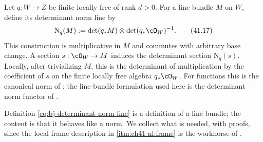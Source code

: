 \begin{definition}
\label{def:ch41-norm-line}
Let $q:W\to Z$ be finite locally free of rank $d>0$.  For a line
bundle $M$ on $W$, define its determinant norm line by
\[
 \mathrm N_q(M):=
 \det(q_*M)\otimes\det(q_*\cO_W)^{-1}.
\tag{41.17}\label{eq:bj-determinant-norm-line}
\]
This construction is multiplicative in $M$ and commutes with arbitrary
base change.  A section $s:\cO_W\to M$ induces the determinant section
$\mathrm N_q(s)$.  Locally, after trivializing $M$, this is the determinant
of multiplication by the coefficient of $s$ on the finite locally free
algebra $q_*\cO_W$.
For functions this is the canonical norm of
\cite[\href{https://stacks.math.columbia.edu/tag/0BD2}{Tag 0BD2}]
{stacks-project}; the line-bundle formulation used here is the determinant
norm functor of \cite[Proposition~3.3]{FerrandNorm}.
\end{definition}

Definition \eqref{eq:bj-determinant-norm-line} is a definition of a line
bundle; the content is that it behaves like a norm.  We collect what is
needed, with proofs, since the local frame description in
\cref{itm:ch41-nl:frame} is the workhorse of .

